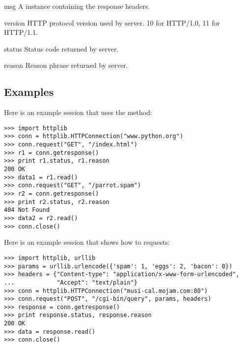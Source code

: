 \begin{datadesc}{msg}
  A  instance containing the response headers.
\end{datadesc}

\begin{datadesc}{version}
  HTTP protocol version used by server.  10 for HTTP/1.0, 11 for HTTP/1.1.
\end{datadesc}

\begin{datadesc}{status}
  Status code returned by server.
\end{datadesc}

\begin{datadesc}{reason}
  Reason phrase returned by server.
\end{datadesc}


\subsection{Examples \label{httplib-examples}}

Here is an example session that uses the  method:

\begin{verbatim}
>>> import httplib
>>> conn = httplib.HTTPConnection("www.python.org")
>>> conn.request("GET", "/index.html")
>>> r1 = conn.getresponse()
>>> print r1.status, r1.reason
200 OK
>>> data1 = r1.read()
>>> conn.request("GET", "/parrot.spam")
>>> r2 = conn.getresponse()
>>> print r2.status, r2.reason
404 Not Found
>>> data2 = r2.read()
>>> conn.close()
\end{verbatim}

Here is an example session that shows how to  requests:

\begin{verbatim}
>>> import httplib, urllib
>>> params = urllib.urlencode({'spam': 1, 'eggs': 2, 'bacon': 0})
>>> headers = {"Content-type": "application/x-www-form-urlencoded",
...            "Accept": "text/plain"}
>>> conn = httplib.HTTPConnection("musi-cal.mojam.com:80")
>>> conn.request("POST", "/cgi-bin/query", params, headers)
>>> response = conn.getresponse()
>>> print response.status, response.reason
200 OK
>>> data = response.read()
>>> conn.close()
\end{verbatim}
